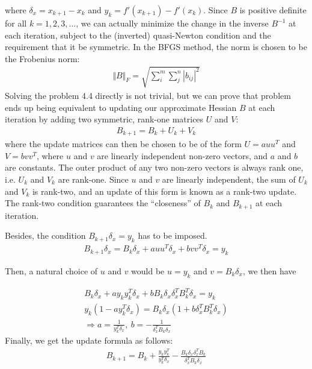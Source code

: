 where $\delta_x = x_{k+1} -x_k$ and $y_k = f'(x_{k+1}) - f'(x_k)$. Since $B$ is positive definite for all $k = 1,2, 3, ...$, we can actually minimize the change in the inverse $B^{-1}$ at each iteration, subject to the (inverted) quasi-Newton condition and the requirement that it be symmetric. In the BFGS method, the norm is chosen to be the Frobenius norm:
\begin{align*}
\Vert B \Vert_F = \sqrt{\sum_{i}^{m} \sum_{j}^{n} |b_{ij}|^2} 
\end{align*}
Solving the problem 4.4 directly is not trivial, but we can prove that problem ends up being equivalent to updating our approximate Hessian $B$ at each iteration by adding two symmetric, rank-one matrices $U$ and $V$:
\begin{align*}
 B_{k+1} = B_k + U_k + V_k
\end{align*}
where the update matrices can then be chosen to be of the form $U = a u u^T$ and $V = b v v^T$, where $u$ and $v$ are linearly independent non-zero vectors, and $a$ and $b$ are constants.  The outer product of any two non-zero vectors is always rank one, i.e. $U_k$ and $V_k$ are rank-one. Since $u$ and $v$ are linearly independent, the sum of $U_k$ and $V_k$ is rank-two, and an update of this form is known as a rank-two update. The rank-two condition guarantees the “closeness” of $B_k$ and $B_{k+1}$ at each iteration. 

Besides, the condition $B_{k+1}\delta_x = y_k$ has to be imposed.
\begin{align*}
	B_{k+1}\delta_x = B_k\delta_x  + a u u^T\delta_x + b v v^T\delta_x = y_k
\end{align*}

Then, a natural choice of $u$ and $v$ would be $u=y_k$ and $v=B_k\delta_x$, we then have

\begin{align*}
	B_k\delta_x + a y_ky^T_k\delta_x + bB_k\delta_x \delta^T_xB_k^T\delta_x = y_k  \\
	y_k(1-ay_k^T\delta_x ) = B_k\delta_x(1+ b \delta^T_xB_k^T\delta_x) \\
	\Rightarrow a = \frac{1}{y_k^T\delta_x}, \  b= - \frac{1}{\delta^T_xB_k\delta_x}
\end{align*}
Finally, we get the update formula as follows: 
\begin{align*}
	B_{k+1} = B_k +  \frac{y_ky_k^T}{y_k^T\delta_x}  - \frac{B_k\delta_x\delta_x^TB_k}{\delta^T_xB_k\delta_x}
\end{align*}





